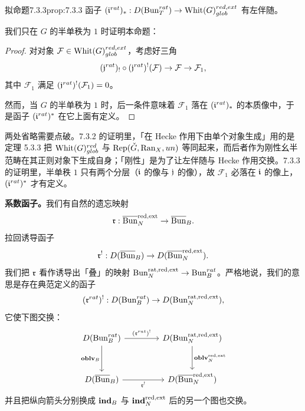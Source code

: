 \begin{othm}{拟命题}{7.3.3}{prop:7.3.3}
函子 $(\mathfrak{i}^{rat})_* : D(\operatorname{Bun}^{rat}_T)\to\mathrm{Whit}(G)^{red,ext}_{glob}$ 有左伴随。
\end{othm}

我们只在 $G$ 的半单秩为 $1$ 时证明本命题：

\begin{proof}
对对象 $\mathcal F\in\mathrm{Whit}(G)^{red,ext}_{glob}$，考虑好三角
\[
  (\mathfrak{j}^{rat})_!\circ(\mathfrak{j}^{rat})^!(\mathcal F)\to\mathcal F\to\mathcal F_1,
\]
其中 $\mathcal F_1$ 满足 $(\mathfrak{j}^{rat})^!(\mathcal F_1)=0$。

然而，当 $G$ 的半单秩为 $1$ 时，后一条件意味着 $\mathcal F_1$ 落在 $(\mathfrak{i}^{rat})_*$ 的本质像中，于是函子 $(\mathfrak{i}^{rat})^*$ 在它上面有定义。
\end{proof}

\begin{annote}
两处省略需要点破。7.3.2 的证明里，「在 Hecke 作用下由单个对象生成」用的是定理 5.3.3 把 $\mathrm{Whit}(G)^{red}_{glob}$ 与 $\operatorname{Rep}(\check G,\mathrm{Ran}_X,un)$ 等同起来，而后者作为刚性幺半范畴在其正则对象下生成自身；「刚性」是为了让左伴随与 Hecke 作用交换。7.3.3 的证明里，半单秩 $1$ 只有两个分层（$\mathfrak{i}$ 的像与 $\mathfrak{j}$ 的像），故 $\mathcal F_1$ 必落在 $\mathfrak{i}$ 的像上，$(\mathfrak{i}^{rat})^*$ 才有定义。\par\vspace{0.15em}{\raggedleft 【来源：原书 p.14 §7.3.2--7.3.3（A）；译者按（用两个分层的情形补足原文省略的推理）】\par}
\end{annote}

\textbf{系数函子。}我们有自然的遗忘映射
\[
  \mathfrak{r} : \overline{\operatorname{Bun}}^{\mathrm{red},\mathrm{ext}}_N\to\overline{\mathrm{Bun}}_B .
\]
拉回诱导函子
\[
  \mathfrak{r}^! : D(\overline{\mathrm{Bun}}_B)\to D(\overline{\operatorname{Bun}}^{\mathrm{red},\mathrm{ext}}_N).
\]
我们把 $\mathfrak{r}$ 看作诱导出「叠」的映射 $\operatorname{Bun}^{\mathrm{rat},\mathrm{red},\mathrm{ext}}_N\to\operatorname{Bun}^{rat}_B$。严格地说，我们的意思是存在典范定义的函子
\[
  (\mathfrak{r}^{rat})^! : D(\operatorname{Bun}^{rat}_B)\to D(\operatorname{Bun}^{\mathrm{rat},\mathrm{red},\mathrm{ext}}_N),
\]
它使下图交换：
\[
\begin{tikzcd}[row sep=2.9em, column sep=4.2em, ampersand replacement=\&]
  D(\Bun\rt_B) \arrow[r, "(\fR\rt)^!"] \arrow[d, "\oblv_B"'] \&
  D(\Bun^{\mathrm{rat},\mathrm{red},\mathrm{ext}}_N) \arrow[d, "\oblv_N^{\mathrm{red},\mathrm{ext}}"] \\
  D(\bBun_B) \arrow[r, "\fR^!"'] \&
  D(\overline{\Bun}^{\mathrm{red},\mathrm{ext}}_N)
\end{tikzcd}
\]
并且把纵向箭头分别换成 $\mathbf{ind}_B$ 与 $\mathbf{ind}_N^{\mathrm{red},\mathrm{ext}}$ 后的另一个图也交换。

